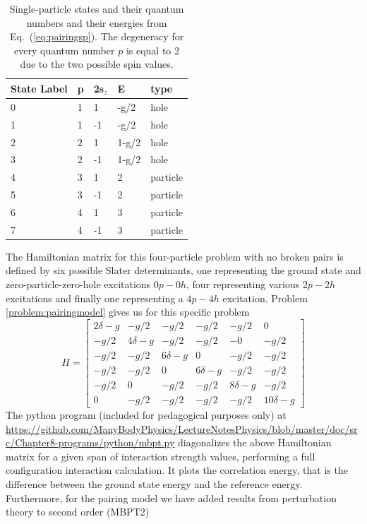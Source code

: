 \begin{table}
\caption{Single-particle states and their quantum numbers and their energies from Eq.~(\ref{eq:pairingsp}). The degeneracy for every quantum number $p$ is equal to 2 due to the two possible spin values.} \label{tab:pairingmodelsp}
  \begin{center}
      \begin{tabular}{| l | l | l | l | l |}
      \hline State Label & p & 2s$_z$ & E & type\\ \hline 0 & 1 & 1 &
      -g/2 & hole \\ \hline 1 & 1 & -1 & -g/2 & hole \\ \hline 2 & 2 &
      1 & 1-g/2 & hole \\ \hline 3 & 2 & -1 & 1-g/2 & hole \\ \hline 4
      & 3 & 1 & 2 & particle \\ \hline 5 & 3 & -1 & 2 & particle
      \\ \hline 6 & 4 & 1 & 3 & particle \\ \hline 7 & 4 & -1 & 3 &
      particle \\ \hline
      \end{tabular}
  \end{center}
\end{table}
The Hamiltonian matrix for this   four-particle problem with no broken pairs is defined by six possible Slater determinants,
one representing the ground state and zero-particle-zero-hole excitations $0p-0h$, four representing various $2p-2h$ excitations and finally one representing a $4p-4h$ excitation. Problem \ref{problem:pairingmodel} gives us for this specific problem
  \[
  H = \begin{bmatrix}
  2\delta -g & -g/2 & -g/2 & -g/2 & -g/2 & 0 \\ -g/2 & 4\delta -g &
  -g/2 & -g/2 & -0 & -g/2 \\ -g/2 & -g/2 & 6\delta -g & 0 & -g/2 &
  -g/2 \\ -g/2 & -g/2 & 0 & 6\delta-g & -g/2 & -g/2 \\ -g/2 & 0 & -g/2
  & -g/2 & 8\delta-g & -g/2 \\ 0 & -g/2 & -g/2 & -g/2 & -g/2 &
  10\delta -g
  \end{bmatrix}
  \]
  The python program (included for pedagogical purposes only) at \url{https://github.com/ManyBodyPhysics/LectureNotesPhysics/blob/master/doc/src/Chapter8-programs/python/mbpt.py} diagonalizes the above Hamiltonian
  matrix for a given span of interaction strength values, performing
  a full configuration interaction calculation. It plots the correlation energy, that is the difference between the ground state energy and the reference energy. Furthermore, for the pairing model we have added results from perturbation theory to second order (MBPT2)

